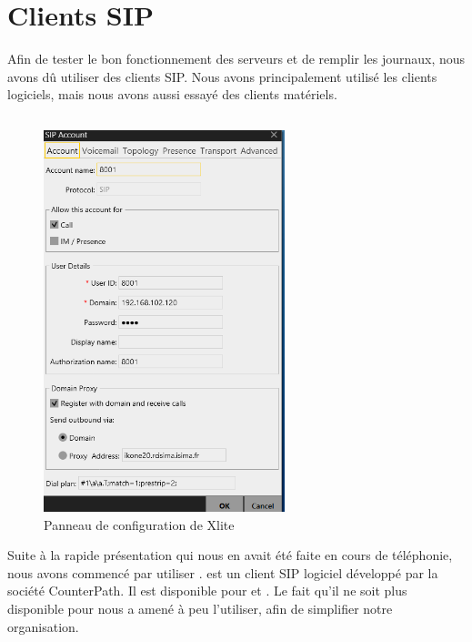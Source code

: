 \section{Clients SIP}

Afin de tester le bon fonctionnement des serveurs et de remplir les journaux, nous avons dû utiliser des clients SIP. Nous avons principalement utilisé les clients logiciels, mais nous avons aussi essayé des clients matériels.

\subsection{\xlite}

\begin{figure}[h]
\begin{center}
\includegraphics[width=7cm]{images/config-xlite.png}
\end{center}
\caption{Panneau de configuration de Xlite}
\end{figure}

Suite à la rapide présentation qui nous en avait été faite en cours de téléphonie, nous avons commencé par utiliser {\xlite}. {\xlite} est un client SIP logiciel développé par la société CounterPath. Il est disponible pour {\win} et {\mac}. Le fait qu’il ne soit plus disponible pour {\lnx} nous a amené à peu l’utiliser, afin de simplifier notre organisation.


\subsection{\lnp}

